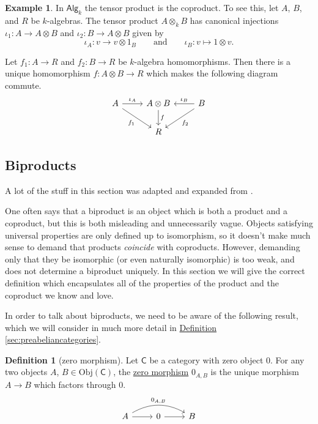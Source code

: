 \documentclass[a4paper,10pt]{scrreprt}
\newcommand{\defn}[1]{\ul{#1}}
\newcommand{\Obj}{\mathrm{Obj}}
\theoremstyle{definition}
\newtheorem{definition}{Definition}[section]
\newtheorem{example}{Example}[section]
\theoremstyle{plain}
\theoremstyle{remark}
\begin{document}
\begin{example}
  In $\mathsf{Alg}_{k}$ the tensor product is the coproduct. To see this, let $A$, $B$, and $R$ be $k$-algebras. The tensor product $A \otimes_{k} B$ has canonical injections $\iota_{1}\colon A \to A \otimes B$ and $\iota_{2}\colon B \to A \otimes B$ given by
  \begin{equation*}
    \iota_{A}\colon v \to v \otimes 1_{B}\qquad\text{and}\qquad \iota_{B}\colon v \mapsto 1 \otimes v.
  \end{equation*}

  Let $f_{1}\colon A \to R$ and $f_{2}\colon B \to R$ be $k$-algebra homomorphisms. Then there is a unique homomorphism $f\colon A \otimes B \to R$ which makes the following diagram commute.
  \begin{equation*}
    \begin{tikzcd}
      A
      \arrow[r, "\iota_{A}"]
      \arrow[dr, swap, "f_{1}"]
      & A \otimes B
      \arrow[d, "f"]
      & B
      \arrow[l, swap, "\iota_{B}"]
      \arrow[dl, "f_{2}"]
      \\
      & R
    \end{tikzcd}
  \end{equation*}
\end{example}

\subsection{Biproducts} \label{sec:biproducts}
A lot of the stuff in this section was adapted and expanded from \cite{annoying-precision-meditation}.

One often says that a biproduct is an object which is both a product and a coproduct, but this is both misleading and unnecessarily vague. Objects satisfying universal properties are only defined up to isomorphism, so it doesn't make much sense to demand that products \emph{coincide} with coproducts. However, demanding only that they be isomorphic (or even naturally isomorphic) is too weak, and does not determine a biproduct uniquely. In this section we will give the correct definition which encapsulates all of the properties of the product and the coproduct we know and love.

In order to talk about biproducts, we need to be aware of the following result, which we will consider in much more detail in \hyperref[sec:preabeliancategories]{Definition \ref*{sec:preabeliancategories}}.

\begin{definition}[zero morphism]
  Let $\mathsf{C}$ be a category with zero object $0$. For any two objects $A$, $B \in \Obj(\mathsf{C})$, the \defn{zero morphism} $0_{A,B}$ is the unique morphism $A \to B$ which factors through $0$.
  \begin{equation*}
    \begin{tikzcd}
      A
      \arrow[rr, bend left, "0_{A, B}"]
      \arrow[r]
      & 0
      \arrow[r]
      & B
    \end{tikzcd}
  \end{equation*}
\end{definition}
\end{document}

